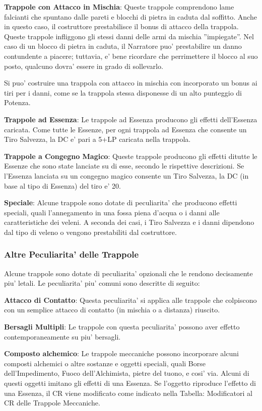\documentclass[a4paper,11pt,twoside,openany]{book}
\begin{document}
{		\textbf{Trappole con Attacco in Mischia}: Queste trappole comprendono lame falcianti che spuntano dalle pareti e blocchi di pietra in caduta dal soffitto. Anche in questo caso, il costruttore prestabilisce il bonus di attacco della trappola. Queste trappole infliggono gli stessi danni delle armi da mischia ''impiegate''. Nel caso di un blocco di pietra in caduta, il Narratore puo' prestabilire un danno contundente a piacere; tuttavia, e' bene ricordare che perrimettere il blocco al suo posto, qualcuno dovra' essere in grado di sollevarlo.
		
		Si puo' costruire una trappola con attacco in mischia con incorporato un bonus ai tiri per i danni, come se la trappola stessa disponesse di un alto punteggio di Potenza.
		
		\textbf{Trappole ad Essenza}: Le trappole ad Essenza producono gli effetti dell'Essenza caricata. Come tutte le Essenze, per ogni trappola ad Essenza che consente un Tiro Salvezza, la DC e' pari a 5+LP caricata nella trappola.
		
		\textbf{Trappole a Congegno Magico}: Queste trappole producono gli effetti ditutte le Essenze che sono state lanciate su di esse, secondo le rispettive descrizioni. Se l'Essenza lanciata su un congegno magico consente un Tiro Salvezza, la DC (in base al tipo di Essenza) del tiro e' 20.
		
		\textbf{Speciale}: Alcune trappole sono dotate di peculiarita' che producono effetti speciali, quali l'annegamento in una fossa piena d'acqua o i danni alle caratteristiche dei veleni. A seconda dei casi, i Tiro Salvezza e i danni dipendono dal tipo di veleno o vengono prestabiliti dal costruttore.
		
		\subsubsection{Altre Peculiarita' delle Trappole}
		
		Alcune trappole sono dotate di peculiarita' opzionali che le rendono decisamente piu' letali. Le peculiarita' piu' comuni sono descritte di seguito:
		
		\textbf{Attacco di Contatto}: Questa peculiarita' si applica alle trappole che colpiscono con un semplice attacco di contatto (in mischia o a distanza) riuscito.
		
		\textbf{Bersagli Multipli}: Le trappole con questa peculiarita' possono aver effetto contemporaneamente su piu' bersagli.
		
		\textbf{Composto alchemico}: Le trappole meccaniche possono incorporare alcuni composti alchemici o altre sostanze e oggetti speciali, quali Borse dell'Impedimento, Fuoco dell'Alchimista, pietre del tuono, e cosi' via. Alcuni di questi oggetti imitano gli effetti di una Essenza. Se l'oggetto riproduce l'effetto di una Essenza, il CR viene modificato come indicato nella Tabella: Modificatori al CR delle Trappole Meccaniche.
		
}
\end{document}
